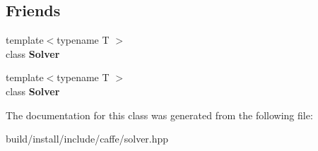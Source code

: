\subsection*{Friends}
\begin{DoxyCompactItemize}
\item 
\mbox{\label{classcaffe_1_1_solver_1_1_callback_a135ddf4017f9df930c2790f5e40d46dc}} 
{\footnotesize template$<$typename T $>$ }\\class {\bfseries Solver}
\item 
\mbox{\label{classcaffe_1_1_solver_1_1_callback_af16c24d236d8afaf30a58e57024c6d60}} 
{\footnotesize template$<$typename T $>$ }\\class {\bfseries Solver}
\end{DoxyCompactItemize}


The documentation for this class was generated from the following file\+:\begin{DoxyCompactItemize}
\item 
build/install/include/caffe/solver.\+hpp\end{DoxyCompactItemize}
